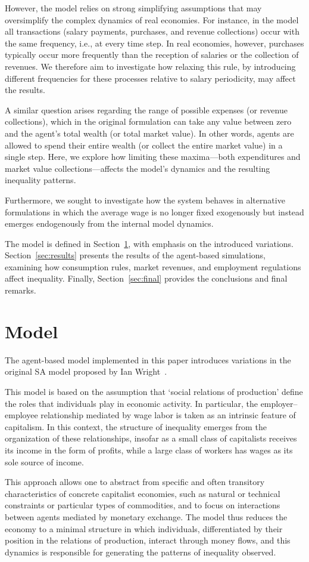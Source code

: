 \documentclass[12pt,preprint]{revtex4-1}
\begin{document}
However, the model relies on strong simplifying assumptions that may oversimplify the complex dynamics of real economies. For instance, in the model all transactions (salary payments, purchases, and revenue collections) occur with the same frequency, i.e., at every time step. In real economies, however, purchases typically occur more frequently than the reception of salaries or the collection of revenues. We therefore aim to investigate how relaxing this rule, by introducing different frequencies for these processes relative to salary periodicity, may affect the results.

A similar question arises regarding the range of possible expenses (or revenue collections), which in the original formulation can take any value between zero and the agent’s total wealth (or total market value). In other words, agents are allowed to spend their entire wealth (or collect the entire market value) in a single step. Here, we explore how limiting these maxima—both expenditures and market value collections—affects the model’s dynamics and the resulting inequality patterns.

Furthermore, we sought to investigate how the system behaves in alternative formulations in which the average wage is no longer fixed exogenously but instead emerges endogenously from the internal model dynamics.

The model is defined in Section~\ref{sec:model}, with emphasis on the introduced variations. Section~\ref{sec:results} presents the results of the agent-based simulations, examining how consumption rules, market revenues, and employment regulations affect inequality. Finally, Section~\ref{sec:final} provides the conclusions and final remarks.


\section{Model}
\label{sec:model}

The agent-based model implemented in this paper introduces variations in the original SA model proposed by Ian Wright~\cite{WRIGHT2005589}. 
{\color{red}
This model is based on the assumption that `social relations of production' \cite{marx2019capital} define the roles that individuals play in economic activity. In particular, the employer–employee relationship mediated by wage labor is taken as an intrinsic feature of capitalism. In this context, the structure of inequality emerges from the organization of these relationships, insofar as a small class of capitalists receives its income in the form of profits, while a large class of workers has wages as its sole source of income.

This approach allows one to abstract from specific and often transitory characteristics of concrete capitalist economies, such as natural or technical constraints or particular types of commodities, and to focus on interactions between agents mediated by monetary exchange. The model thus reduces the economy to a minimal structure in which individuals, differentiated by their position in the relations of production, interact through money flows,  and this dynamics is responsible for generating the patterns of inequality observed.
}
\end{document}
